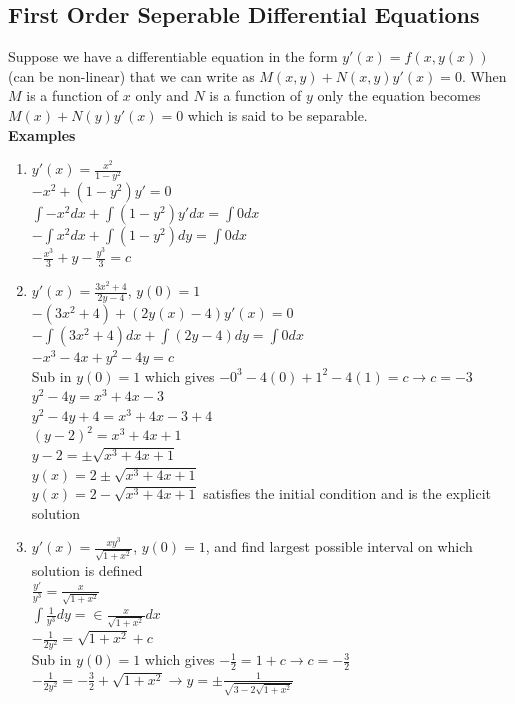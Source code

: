 \documentclass{article}
\begin{document}
\subsection{First Order Seperable Differential Equations}
\label{sec:fseperable}
Suppose we have a differentiable equation in the form $y'(x)=f(x,y(x))$ (can be non-linear) that we can write as $M(x,y)+N(x,y)y'(x)=0$. When $M$ is a function of $x$ only and $N$ is a function of $y$ only the equation becomes $M(x)+N(y)y'(x)=0$ which is said to be separable. \\
\textbf{Examples}
\begin{enumerate}
    \item $y'(x)=\frac{x^2}{1-y^2}$\\
    $-x^2+(1-y^2)y'=0$\\
    $\int-x^2dx+\int(1-y^2)y'dx=\int0dx$\\
    $-\int x^2dx+\int(1-y^2)dy=\int0dx$\\
    $-\frac{x^3}{3}+y-\frac{y^3}{3}=c$
    \item $y'(x)=\frac{3x^2+4}{2y-4}$, $y(0)=1$\\
    $-(3x^2+4)+(2y(x)-4)y'(x)=0$\\
    $-\int(3x^2+4)dx+\int(2y-4)dy=\int0dx$\\
    $-x^3-4x+y^2-4y=c$\\
    Sub in $y(0)=1$ which gives $-0^3-4(0)+1^2-4(1)=c\rightarrow c=-3$\\
    $y^2-4y=x^3+4x-3$\\
    $y^2-4y+4=x^3+4x-3+4$\\
    $(y-2)^2=x^3+4x+1$\\
    $y-2=\pm\sqrt{x^3+4x+1}$\\
    $y(x)=2\pm\sqrt{x^3+4x+1}$\\
    $y(x)=2-\sqrt{x^3+4x+1}$ satisfies the initial condition and is the explicit solution
    \item $y'(x)=\frac{xy^3}{\sqrt{1+x^2}}$, $y(0)=1$, and find largest possible interval on which solution is defined\\
    $\frac{y'}{y^3}=\frac{x}{\sqrt{1+x^2}}$\\
    $\int\frac{1}{y^3}dy=\in\frac{x}{\sqrt{1+x^2}}dx$\\
    $-\frac{1}{2y^2}=\sqrt{1+x^2}+c$\\
    Sub in $y(0)=1$ which gives $-\frac{1}{2}=1+c\rightarrow c=-\frac{3}{2}$\\
    $-\frac{1}{2y^2}=-\frac{3}{2}+\sqrt{1+x^2}\rightarrow y=\pm\frac{1}{\sqrt{3-2\sqrt{1+x^2}}}$\\

\end{enumerate}
\end{document}
